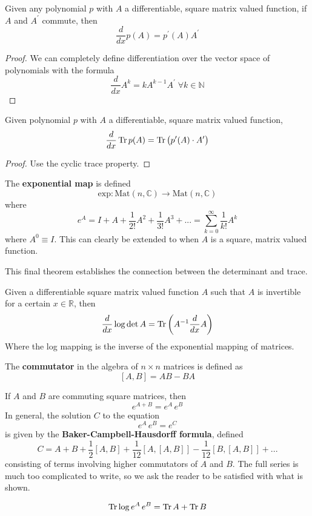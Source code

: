   \begin{corollary}
  Given any polynomial $p$ with $A$ a differentiable, square matrix valued function, if $A$ and $A^\prime$ commute, then 
  \[\frac{d}{d x} p(A) = p^\prime (A) A^\prime\]
  \end{corollary}
  \begin{proof}
  We can completely define differentiation over the vector space of polynomials with the formula
  \[\frac{d}{d x} A^k = k A^{k-1} A^\prime \; \forall k \in \mathbb{N}\]
  \end{proof}

  \begin{corollary}
  Given polynomial $p$ with $A$ a differentiable, square matrix valued function, 
  \[\frac{d}{d x} \operatorname{Tr}{p(A)} = \operatorname{Tr}{\big( p^\prime(A) \cdot A^\prime \big)}\]
  \end{corollary}
  \begin{proof}
  Use the cyclic trace property.
  \end{proof}

  \begin{definition}
  The \textbf{exponential map} is defined
  \[\text{exp}: \text{Mat}(n, \mathbb{C}) \longrightarrow \text{Mat}(n, \mathbb{C})\]
  where 
  \[e^A = I + A + \frac{1}{2!} A^2 + \frac{1}{3!} A^3 + ... = \sum_{k=0}^\infty \frac{1}{k!} A^k\]
  where $A^0 \equiv I$. This can clearly be extended to when $A$ is a square, matrix valued function. 
  \end{definition}

  This final theorem establishes the connection between the determinant and trace. 

  \begin{theorem}
  Given a differentiable square matrix valued function $A$ such that $A$ is invertible for a certain $x \in \mathbb{R}$, then 
  \[\frac{d}{d x} \log{\det{A}} = \operatorname{Tr} \bigg( A^{-1} \frac{d}{d x} A \bigg)\]
  Where the log mapping is the inverse of the exponential mapping of matrices. 
  \end{theorem}

  \begin{definition}
  The \textbf{commutator} in the algebra of $n \times n$ matrices is defined as 
  \[[A, B] = A B - B A\]
  \end{definition}

  \begin{theorem}
  If $A$ and $B$ are commuting square matrices, then 
  \[e^{A + B} = e^A \, e^B\]
  In general, the solution $C$ to the equation
  \[e^{A} \, e^B = e^C\]
  is given by the \textbf{Baker-Campbell-Hausdorff formula}, defined
  \[C = A + B + \frac{1}{2}[A,B] + \frac{1}{12} [A,[A,B]] - \frac{1}{12} [B,[A,B]] + ...\]
  consisting of terms involving higher commutators of $A$ and $B$. The full series is much too complicated to write, so we ask the reader to be satisfied with what is shown. 
  \end{theorem}

  \begin{corollary}
  \[\operatorname{Tr}{\log{e^A \, e^B}} = \operatorname{Tr}{A} + \operatorname{Tr}{B}\]
  \end{corollary}

